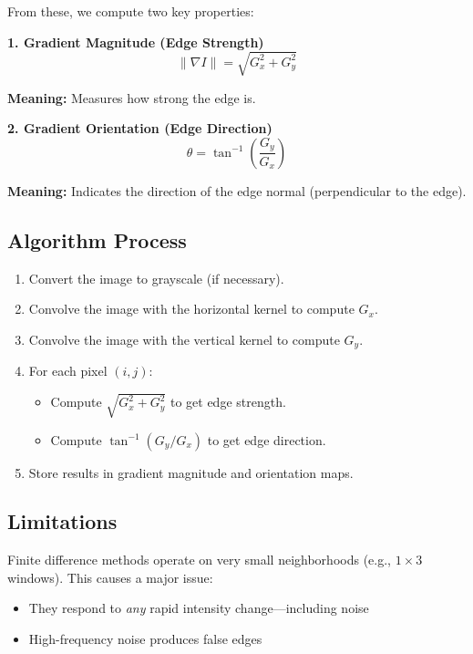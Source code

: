 \documentclass[12pt]{article}
\begin{document}
\begin{enumerate}
          From these, we compute two key properties:

          \textbf{1. Gradient Magnitude (Edge Strength)}
          \[
              \|\nabla I\| = \sqrt{G_x^2 + G_y^2}
          \]

          \textbf{Meaning:} Measures how strong the edge is.

          \textbf{2. Gradient Orientation (Edge Direction)}
          \[
              \theta = \tan^{-1}\left(\frac{G_y}{G_x}\right)
          \]

          \textbf{Meaning:} Indicates the direction of the edge normal (perpendicular to the edge).

          \vspace{1em}

\end{enumerate}

\subsection{Algorithm Process}
\begin{enumerate}
    \item Convert the image to grayscale (if necessary).
    \item Convolve the image with the horizontal kernel to compute $G_x$.
    \item Convolve the image with the vertical kernel to compute $G_y$.
    \item For each pixel $(i,j)$:
          \begin{itemize}
              \item Compute $\sqrt{G_x^2 + G_y^2}$ to get edge strength.
              \item Compute $\tan^{-1}(G_y / G_x)$ to get edge direction.
          \end{itemize}
    \item Store results in gradient magnitude and orientation maps.
\end{enumerate}

\subsection{Limitations}
Finite difference methods operate on very small neighborhoods (e.g., $1 \times 3$ windows). This causes a major issue:

\begin{itemize}
    \item They respond to \textit{any} rapid intensity change—including noise
    \item High-frequency noise produces false edges
\end{itemize}
\end{document}
